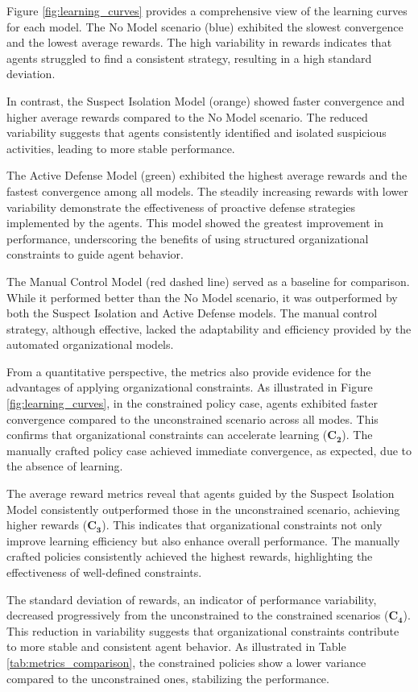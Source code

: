 \documentclass[conference]{IEEEtran}
\begin{document}
Figure \ref{fig:learning_curves} provides a comprehensive view of the learning curves for each model. The No Model scenario (blue) exhibited the slowest convergence and the lowest average rewards. The high variability in rewards indicates that agents struggled to find a consistent strategy, resulting in a high standard deviation.

In contrast, the Suspect Isolation Model (orange) showed faster convergence and higher average rewards compared to the No Model scenario. The reduced variability suggests that agents consistently identified and isolated suspicious activities, leading to more stable performance.

The Active Defense Model (green) exhibited the highest average rewards and the fastest convergence among all models. The steadily increasing rewards with lower variability demonstrate the effectiveness of proactive defense strategies implemented by the agents. This model showed the greatest improvement in performance, underscoring the benefits of using structured organizational constraints to guide agent behavior.

The Manual Control Model (red dashed line) served as a baseline for comparison. While it performed better than the No Model scenario, it was outperformed by both the Suspect Isolation and Active Defense models. The manual control strategy, although effective, lacked the adaptability and efficiency provided by the automated organizational models.

From a quantitative perspective, the metrics also provide evidence for the advantages of applying organizational constraints. As illustrated in Figure \ref{fig:learning_curves}, in the constrained policy case, agents exhibited faster convergence compared to the unconstrained scenario across all modes. This confirms that organizational constraints can accelerate learning ($\mathbf{C_2}$). The manually crafted policy case achieved immediate convergence, as expected, due to the absence of learning.

The average reward metrics reveal that agents guided by the Suspect Isolation Model consistently outperformed those in the unconstrained scenario, achieving higher rewards ($\mathbf{C_3}$). This indicates that organizational constraints not only improve learning efficiency but also enhance overall performance. The manually crafted policies consistently achieved the highest rewards, highlighting the effectiveness of well-defined constraints.

The standard deviation of rewards, an indicator of performance variability, decreased progressively from the unconstrained to the constrained scenarios ($\mathbf{C_4}$). This reduction in variability suggests that organizational constraints contribute to more stable and consistent agent behavior. As illustrated in Table \ref{tab:metrics_comparison}, the constrained policies show a lower variance compared to the unconstrained ones, stabilizing the performance.
\end{document}
